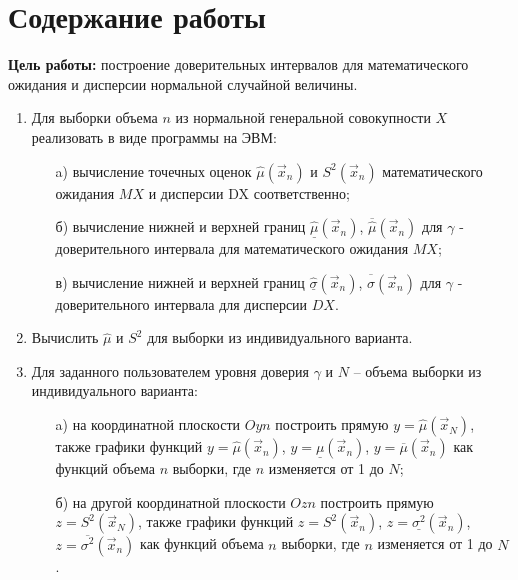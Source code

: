 \chapter{Содержание работы}

\textbf{Цель работы:} построение доверительных интервалов для математического ожидания и дисперсии нормальной случайной величины.

\begin{enumerate}
    \item Для выборки объема $n$ из нормальной генеральной совокупности $X$ реализовать в виде программы на ЭВМ:

    \begin{enumerate}
        \item[a)] вычисление точечных оценок $\hat\mu (\vec x_n)$ и $S^2 (\vec x_n)$ математического ожидания $MX$ и дисперсии DX соответственно;
        \item[б)] вычисление нижней и верхней границ $\underline{\hat\mu} (\vec x_n)$, $\overline{\hat\mu} (\vec x_n)$ для $\gamma$ - доверительного интервала для математического ожидания $MX$;
        \item[в)] вычисление нижней и верхней границ $\underline{\hat\sigma} (\vec x_n)$, $\overline{\hat\sigma} (\vec x_n)$ для $\gamma$ - доверительного интервала для дисперсии $DX$.
    \end{enumerate}

    \item Вычислить $\hat\mu$ и $S^2$ для выборки из индивидуального варианта.
    \item Для заданного пользователем уровня доверия $\gamma$ и $N$ -- объема выборки из индивидуального варианта:
    
	\begin{enumerate}
        \item[a)] на координатной плоскости $Oyn$ построить прямую $y = {\hat\mu} (\vec x_N)$, также графики функций $y = {\hat\mu} (\vec x_n)$, $y = \underline{\mu} (\vec x_n)$, $y = \overline{\mu} (\vec x_n)$ как функций объема $n$ выборки, где $n$ изменяется от 1 до $N$;
        \item[б)] на другой координатной плоскости $Ozn$ построить прямую\newline $z = S^2 (\vec x_N)$, также графики функций $z = S^2 (\vec x_n)$, $z = \underline{\sigma^2} (\vec x_n)$,\newline $z = \overline{\sigma^2} (\vec x_n)$ как функций объема $n$ выборки, где $n$ изменяется от 1 до $N$.
    \end{enumerate}
\end{enumerate}
